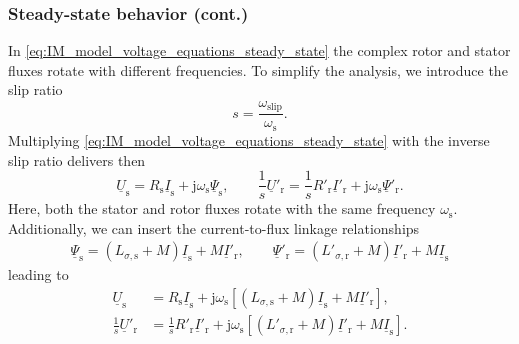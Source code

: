 \begin{frame}
	\frametitle{Steady-state behavior (cont.)}
    In \eqref{eq:IM_model_voltage_equations_steady_state} the complex rotor and stator fluxes rotate with different frequencies. To simplify the analysis, we introduce the slip ratio
    \begin{equation}
        s = \frac{\omega_\mathrm{slip}}{\omega_\mathrm{s}} .
    \end{equation} 
    Multiplying \eqref{eq:IM_model_voltage_equations_steady_state}  with the inverse slip ratio delivers then
    \begin{equation}
            \underline{U}_\mathrm{s} = R_\mathrm{s} \underline{I}_\mathrm{s} + \mathrm{j}\omega_\mathrm{s}\underline{\Psi}_\mathrm{s}, \qquad
            \frac{1}{s}\underline{U}'_\mathrm{r} = \frac{1}{s}R'_\mathrm{r} \underline{I}'_\mathrm{r} +\mathrm{j}\omega_\mathrm{s}\underline{\Psi}'_\mathrm{r}.
        \label{eq:IM_model_voltage_equations_steady_state_slip_ratio}
    \end{equation}
    Here, both the stator and rotor fluxes rotate with the same frequency $\omega_\mathrm{s}$. Additionally, we can insert the current-to-flux linkage relationships
    \begin{align}
        \underline{\Psi}_\mathrm{s} = (L_{\sigma,\mathrm{s}} +M) \underline{I}_\mathrm{s} +  M\underline{I}'_\mathrm{r}, \qquad
        \underline{\Psi}'_\mathrm{r} = (L'_{\sigma,\mathrm{r}} + M) \underline{I}'_\mathrm{r} +  M \underline{I}_\mathrm{s}
        \label{eq:IM_model_current_flux_linkage_equations_steady_state}
    \end{align}
    leading to
    \begin{equation}
        \begin{alignedat}{2}
            \underline{U}_\mathrm{s} &= R_\mathrm{s} \underline{I}_\mathrm{s} + \mathrm{j}\omega_\mathrm{s}\left[(L_{\sigma,\mathrm{s}} +M) \underline{I}_\mathrm{s} +  M\underline{I}'_\mathrm{r}\right],\\
            \frac{1}{s}\underline{U}'_\mathrm{r} &= \frac{1}{s}R'_\mathrm{r} \underline{I}'_\mathrm{r} +\mathrm{j}\omega_\mathrm{s}\left[(L'_{\sigma,\mathrm{r}} + M) \underline{I}'_\mathrm{r} +  M \underline{I}_\mathrm{s}\right].
        \end{alignedat}
        \label{eq:IM_model_voltage_equations_steady_state_current_flux_linkage}
    \end{equation}
\end{frame}

